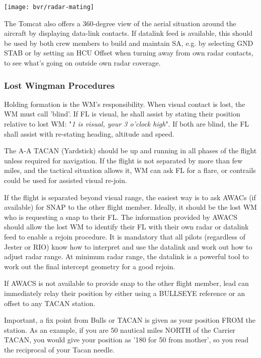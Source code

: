 \texttt{[image: bvr/radar-mating]}

The Tomcat also offers a 360-degree view of the aerial situation around the
aircraft by displaying data-link contacts. If datalink feed is available, this
should be used by both crew members to build and maintain SA, e.g. by selecting
GND STAB or by setting an HCU Offset when turning away from own radar contacts,
to see what's going on outside own radar coverage.

\newpage

\subsubsection{Lost Wingman Procedures}

Holding formation is the WM's responsibility. When visual contact is lost, the
WM must call 'blind'. If FL is visual, he shall assist by stating their
position relative to lost WM: "\textit{1 is visual, your 3 o'clock high}". If
both are blind, the FL shall assist with re-stating heading, altitude and speed.

The A-A TACAN (Yardstick) should be up and running in all phases of the flight
unless required for navigation. If the flight is not separated by more than few
miles, and the tactical situation allows it, WM can ask FL for a flare, or
contrails could be used for assisted visual re-join.

If the flight is separated beyond visual range, the easiest way is to ask
AWACs (if available) for SNAP to the other flight member. Ideally, it should be
the lost WM who is requesting a snap to their FL. The information provided by
AWACS should allow the lost WM to identify their FL with their own radar or
datalink feed to enable a rejoin procedure. It is mandatory that all pilots
(regardless of Jester or RIO) know how to interpret and use the datalink and
work out how to adjust radar range. At minimum radar range, the datalink is a
powerful tool to work out the final intercept geometry for a good rejoin.

If AWACS is not available to provide snap to the other flight member, lead can
immediately relay their position by either using a BULLSEYE reference or an
offset to any TACAN station.

Important, a fix point from Bulls or TACAN is given as your position FROM the
station. As an example, if you are 50 nautical miles NORTH of the Carrier
TACAN, you would give your position as '180 for 50 from mother', so you read
the reciprocal of your Tacan needle.

